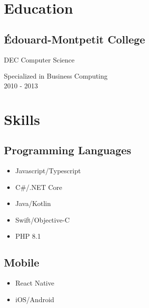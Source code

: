 \documentclass{article}
\begin{document}
\setlength{\columnsep}{4em}
\setlength{\columnseprule}{0.4pt}
\begin{paracol}{2}
  \begin{leftcolumn}
    \vspace{-2.5em}
    \section{Education}

    \subsection{Édouard-Montpetit College}
    {DEC Computer Science\par}
    Specialized in Business Computing \\
    2010 - 2013

    \section{Skills}

    \subsection{Programming Languages}
    \begin{itemize}
      \item Javascript/Typescript
      \item C\#/.NET Core
      \item Java/Kotlin
      \item Swift/Objective-C
      \item PHP 8.1
    \end{itemize}

    \vspace{0.5em}

    \subsection{Mobile}
    \begin{itemize}
      \item React Native
      \item iOS/Android
    \end{itemize}


\end{leftcolumn}
\end{paracol}
\end{document}

